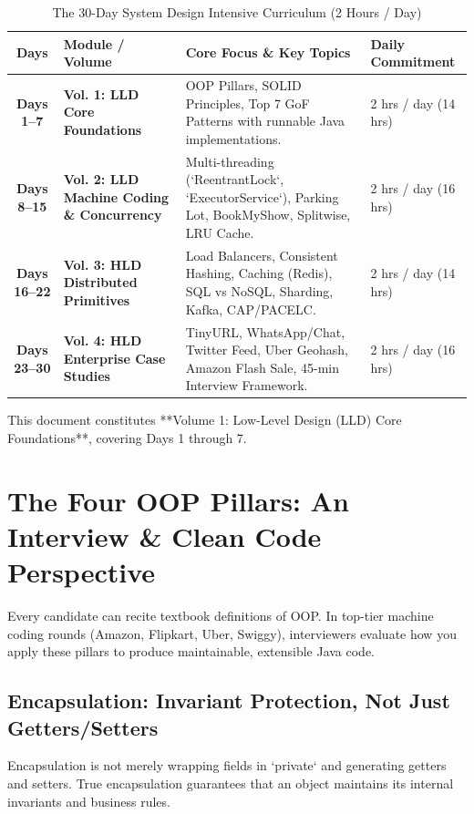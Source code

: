 \documentclass[10pt,journal,compsoc,onecolumn]{IEEEtran}
\begin{document}
\begin{table}[htbp]
\caption{The 30-Day System Design Intensive Curriculum (2 Hours / Day)}
\label{tab:30day_roadmap}
\centering
\begin{tabular}{cp{4.5cm}p{6.0cm}l}
\toprule
\textbf{Days} & \textbf{Module / Volume} & \textbf{Core Focus \& Key Topics} & \textbf{Daily Commitment} \\
\midrule
\textbf{Days 1--7} & \textbf{Vol. 1: LLD Core Foundations} & OOP Pillars, SOLID Principles, Top 7 GoF Patterns with runnable Java implementations. & 2 hrs / day (14 hrs) \\
\midrule
\textbf{Days 8--15} & \textbf{Vol. 2: LLD Machine Coding \& Concurrency} & Multi-threading (`ReentrantLock`, `ExecutorService`), Parking Lot, BookMyShow, Splitwise, LRU Cache. & 2 hrs / day (16 hrs) \\
\midrule
\textbf{Days 16--22} & \textbf{Vol. 3: HLD Distributed Primitives} & Load Balancers, Consistent Hashing, Caching (Redis), SQL vs NoSQL, Sharding, Kafka, CAP/PACELC. & 2 hrs / day (14 hrs) \\
\midrule
\textbf{Days 23--30} & \textbf{Vol. 4: HLD Enterprise Case Studies} & TinyURL, WhatsApp/Chat, Twitter Feed, Uber Geohash, Amazon Flash Sale, 45-min Interview Framework. & 2 hrs / day (16 hrs) \\
\bottomrule
\end{tabular}
\end{table}

This document constitutes **Volume 1: Low-Level Design (LLD) Core Foundations**, covering Days 1 through 7.

\section{The Four OOP Pillars: An Interview \& Clean Code Perspective}
\label{sec:oop_pillars}

Every candidate can recite textbook definitions of OOP. In top-tier machine coding rounds (Amazon, Flipkart, Uber, Swiggy), interviewers evaluate how you apply these pillars to produce maintainable, extensible Java code.

\subsection{Encapsulation: Invariant Protection, Not Just Getters/Setters}
Encapsulation is not merely wrapping fields in `private` and generating getters and setters. True encapsulation guarantees that an object maintains its internal invariants and business rules.
\end{document}
